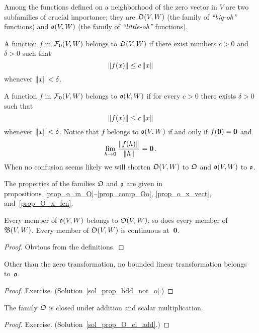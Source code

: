 Among the functions defined on a neighborhood of the zero vector in $V$ are two
subfamilies of crucial importance; they are $\mathfrak{O}(V,W)$ (the family of
\emph{``big-oh''} functions) and $\mathfrak{o}(V,W)$ (the family of \emph{``little-oh''}
functions).

\begin{defn}  A function $f$ in $\mathcal{F}_{\mathbf{0}}(V,W)$ belongs to
$\mathfrak{O}(V,W)$ if there exist numbers $c > 0$ and $\delta > 0$ such that
 \[\lVert f(x)\rVert \le c\,\lVert x\rVert\]
whenever $\lVert x\rVert < \delta$.

A function $f$ in $\mathcal{F}_{\mathbf{0}}(V,W)$ belongs to
$\mathfrak{o}(V,W)$ if for every $c > 0$ there exists $\delta > 0$ such that
  \[ \lVert f(x)\rVert \le c\,\lVert x\rVert \]
whenever $\lVert x\rVert < \delta$.  Notice that $f$ belongs to $\mathfrak{o}(V,W)$ if and only if $f(\mathbf{0}) = \mathbf{0}$ and
  \[ \lim_{h \rightarrow \mathbf{0}}\frac{\lVert f(h)\rVert}{\lVert h\rVert} = \mathbf{0}\,. \]
When no confusion seems likely we will shorten $\mathfrak{O}(V,W)$ to $\mathfrak{O}$ and $\mathfrak{o}(V,W)$
to $\mathfrak{o}$.
\end{defn}


The properties of the families $\mathfrak{O}$ and $\mathfrak{o}$ are given in
propositions~\ref{prop_o_in_O}--\ref{prop_comp_Oo}, \ref{prop_o_x_vect},
and~\ref{prop_O_x_fcn}.

\begin{prop}\label{prop_o_in_O} Every member of $\mathfrak{o}(V,W)$ belongs to $\mathfrak{O}(V,W)$; so does
every member of $\mathfrak{B}(V,W)$. Every member of $\mathfrak{O}(V,W)$ is continuous at~$\mathbf{0}$.
\end{prop}

\begin{proof}  Obvious from the definitions.   \end{proof}

\begin{prop}\label{prop_bdd_not_o} Other than the zero transformation, no bounded linear
transformation belongs to~$\mathfrak{o}$.
\end{prop}

\begin{proof} Exercise. (Solution~\ref{sol_prop_bdd_not_o}.)  \ns  \end{proof}

\begin{prop}\label{prop_O_cl_add} The family $\mathfrak{O}$ is closed under addition and scalar
multiplication.
\end{prop}

\begin{proof} Exercise. (Solution~\ref{sol_prop_O_cl_add}.) \ns   \end{proof}

